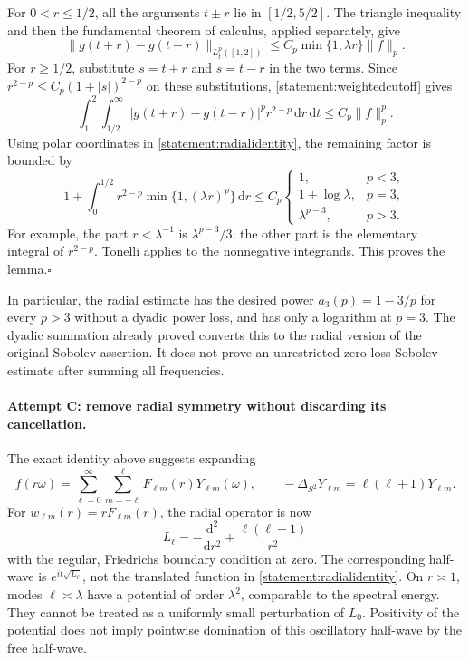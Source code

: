 \documentclass[11pt]{article}
\newcommand{\dd}{\,\mathrm d}
\begin{document}
	For $0<r\leq1/2$, all the arguments $t\pm r$ lie in $[1/2,5/2]$.
	The triangle inequality and then the fundamental theorem of calculus,
	applied separately, give
	\[
	\|g(t+r)-g(t-r)\|_{L^p_t([1,2])}
	\leq C_p\min\{1,\lambda r\}\|f\|_p.
	\]
	For $r\geq1/2$, substitute $s=t+r$ and $s=t-r$ in the two terms.
	Since $r^{2-p}\leq C_p(1+|s|)^{2-p}$ on these substitutions,
	\eqref{statement:weightedcutoff} gives
	\[
	\int_1^2\int_{1/2}^{\infty}
	|g(t+r)-g(t-r)|^p r^{2-p}\dd r\dd t
	\leq C_p\|f\|_p^p.
	\]
	Using polar coordinates in \eqref{statement:radialidentity}, the remaining
	factor is bounded by
	\begin{equation}\label{statement:radialintegral}
		1+\int_0^{1/2}r^{2-p}\min\{1,(\lambda r)^p\}\dd r
		\leq C_p
		\begin{cases}
			1,&p<3,\\
			1+\log\lambda,&p=3,\\
			\lambda^{p-3},&p>3.
		\end{cases}
	\end{equation}
	For example, the part $r<\lambda^{-1}$ is
	$\lambda^{p-3}/3$; the other part is the elementary integral of
	$r^{2-p}$. Tonelli applies to the nonnegative integrands. This proves
	the lemma.\hfill$\square$
	
	In particular, the radial estimate has the desired power
	$a_3(p)=1-3/p$ for every $p>3$ without a dyadic power loss, and has only
	a logarithm at $p=3$. The dyadic summation already proved converts this
	to the radial version of the original Sobolev assertion. It does not
	prove an unrestricted zero-loss Sobolev estimate after summing all
	frequencies.
	
	\paragraph{Attempt C: remove radial symmetry without discarding its cancellation.}
	The exact identity above suggests expanding
	\[
	f(r\omega)=\sum_{\ell=0}^{\infty}\sum_{m=-\ell}^{\ell}
	F_{\ell m}(r)Y_{\ell m}(\omega),
	\qquad -\Delta_{S^2}Y_{\ell m}=\ell(\ell+1)Y_{\ell m}.
	\]
	For $w_{\ell m}(r)=rF_{\ell m}(r)$, the radial operator is now
	\begin{equation}\label{statement:angularbarrier}
		L_\ell=-\frac{\mathrm d^2}{\mathrm dr^2}
		+\frac{\ell(\ell+1)}{r^2}
	\end{equation}
	with the regular, Friedrichs boundary condition at zero. The corresponding
	half-wave is $e^{it\sqrt{L_\ell}}$, not the translated function in
	\eqref{statement:radialidentity}. On $r\asymp1$, modes $\ell\asymp\lambda$
	have a potential of order $\lambda^2$, comparable to the spectral energy.
	They cannot be treated as a uniformly small perturbation of $L_0$.
	Positivity of the potential does not imply pointwise domination of this
	oscillatory half-wave by the free half-wave.
	
\end{document}

